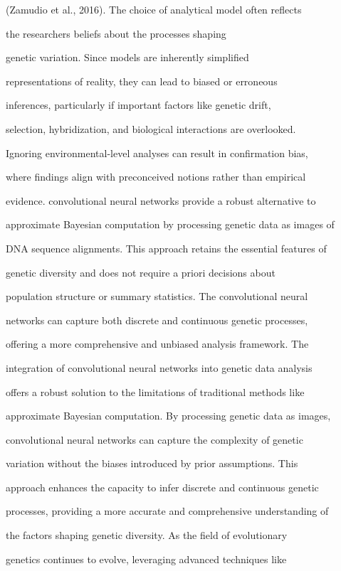 \documentclass[10pt,twoside]{article}
\numberwithin{equation}{section}
\begin{document}
(Zamudio et al., 2016). The choice of analytical model often reflects

the researchers\textquotesingle{} beliefs about the processes shaping

genetic variation. Since models are inherently simplified

representations of reality, they can lead to biased or erroneous

inferences, particularly if important factors like genetic drift,

selection, hybridization, and biological interactions are overlooked.

Ignoring environmental-level analyses can result in confirmation bias,

where findings align with preconceived notions rather than empirical

evidence. convolutional neural networks provide a robust alternative to

approximate Bayesian computation by processing genetic data as images of

DNA sequence alignments. This approach retains the essential features of

genetic diversity and does not require a priori decisions about

population structure or summary statistics. The convolutional neural

networks can capture both discrete and continuous genetic processes,

offering a more comprehensive and unbiased analysis framework. The

integration of convolutional neural networks into genetic data analysis

offers a robust solution to the limitations of traditional methods like

approximate Bayesian computation. By processing genetic data as images,

convolutional neural networks can capture the complexity of genetic

variation without the biases introduced by prior assumptions. This

approach enhances the capacity to infer discrete and continuous genetic

processes, providing a more accurate and comprehensive understanding of

the factors shaping genetic diversity. As the field of evolutionary

genetics continues to evolve, leveraging advanced techniques like
\end{document}
